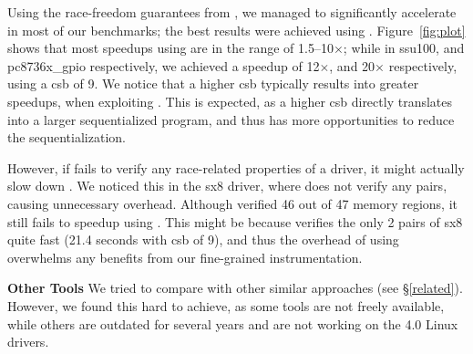 Using the race-freedom guarantees from \whoop, we managed to significantly accelerate \corral in most of our benchmarks; the best results were achieved using \yieldmr. Figure~\ref{fig:plot} shows that most speedups using \yieldmr are in the range of 1.5--10$\times$; while in ssu100, and pc8736x\_gpio respectively, we achieved a speedup of 12$\times$, and 20$\times$ respectively, using a csb of 9. We notice that a higher csb typically results into greater speedups, when exploiting \whoop. This is expected, as a higher csb directly translates into a larger sequentialized program, and thus \whoop has more opportunities to reduce the sequentialization.

However, if \whoop fails to verify any race-related properties of a driver, it might actually slow down \corral. We noticed this in the sx8 driver, where \whoop does not verify any pairs, causing unnecessary overhead. Although \whoop verified 46 out of 47 memory regions, it still fails to speedup \corral using \yieldmr. This might be because \corral verifies the only 2 pairs of sx8 quite fast (21.4 seconds with csb of 9), and thus the overhead of using \whoop overwhelms any benefits from our fine-grained instrumentation.

\medskip\noindent\textbf{Other Tools }
%
We tried to compare \whoop with other similar approaches (see \S\ref{related}). However, we found this hard to achieve, as some tools are not freely available, while others are outdated for several years and are not working on the 4.0 Linux drivers.
